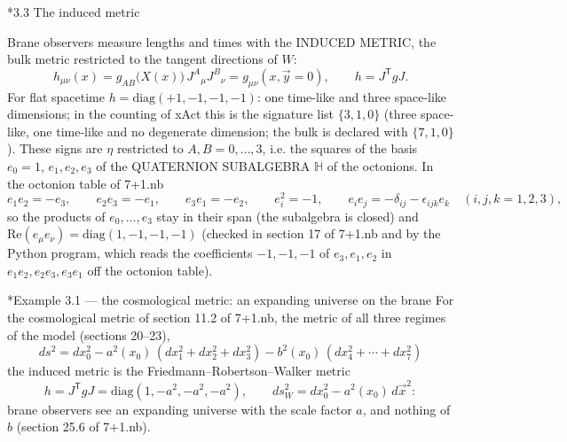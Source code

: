 \documentclass[10pt,a4paper]{article}
\makeatletter
\renewcommand\subsection{\@startsection{subsection}{2}{\z@}{-3.25ex\@plus -1ex \@minus -.2ex}{1.5ex \@plus .2ex}{\normalfont\large\bfseries\raggedright}}
\renewcommand\subsubsection{\@startsection{subsubsection}{3}{\z@}{-3.25ex\@plus -1ex \@minus -.2ex}{1.5ex \@plus .2ex}{\normalfont\normalsize\bfseries\raggedright}}
\makeatother
\begin{document}
\subsection*{3.3 The induced metric}
Brane observers measure lengths and times with the INDUCED METRIC, the bulk metric restricted to the tangent directions of $W$:
\begin{equation*}
h_{\mu\nu}(x)=g_{AB}\big(X(x)\big)\,J^A{}_\mu J^B{}_\nu=g_{\mu\nu}(x,\vec y=0),\qquad h=J^{\mathsf T}gJ .
\end{equation*}
For flat spacetime $h=\mathrm{diag}(+1,-1,-1,-1)$: one time-like and three space-like dimensions; in the counting of xAct this is the signature list $\{3,1,0\}$ (three space-like, one time-like and no degenerate dimension; the bulk is declared with $\{7,1,0\}$). These signs are $\eta$ restricted to $A,B=0,\dots,3$, i.e. the squares of the basis $e_0=1$, $e_1,e_2,e_3$ of the QUATERNION SUBALGEBRA $\mathbb H$ of the octonions. In the octonion table of 7+1.nb
\begin{equation*}
e_1e_2=-e_3,\qquad e_2e_3=-e_1,\qquad e_3e_1=-e_2,\qquad e_i^2=-1,\qquad e_ie_j=-\delta_{ij}-\epsilon_{ijk}e_k\quad(i,j,k=1,2,3),
\end{equation*}
so the products of $e_0,\dots,e_3$ stay in their span (the subalgebra is closed) and $\mathrm{Re}(e_\mu e_\nu)=\mathrm{diag}(1,-1,-1,-1)$ (checked in section 17 of 7+1.nb and by the Python program, which reads the coefficients $-1,-1,-1$ of $e_3,e_1,e_2$ in $e_1e_2,e_2e_3,e_3e_1$ off the octonion table).

\subsubsection*{Example 3.1 — the cosmological metric: an expanding universe on the brane}
For the cosmological metric of section 11.2 of 7+1.nb, the metric of all three regimes of the model (sections 20–23),
\begin{equation*}
ds^2=dx_0^2-a^2(x_0)\,(dx_1^2+dx_2^2+dx_3^2)-b^2(x_0)\,(dx_4^2+\cdots+dx_7^2)
\end{equation*}
the induced metric is the Friedmann–Robertson–Walker metric
\begin{equation*}
h=J^{\mathsf T}gJ=\mathrm{diag}(1,-a^2,-a^2,-a^2),\qquad ds_W^2=dx_0^2-a^2(x_0)\,d\vec x^2 :
\end{equation*}
brane observers see an expanding universe with the scale factor $a$, and nothing of $b$ (section 25.6 of 7+1.nb).
\end{document}
